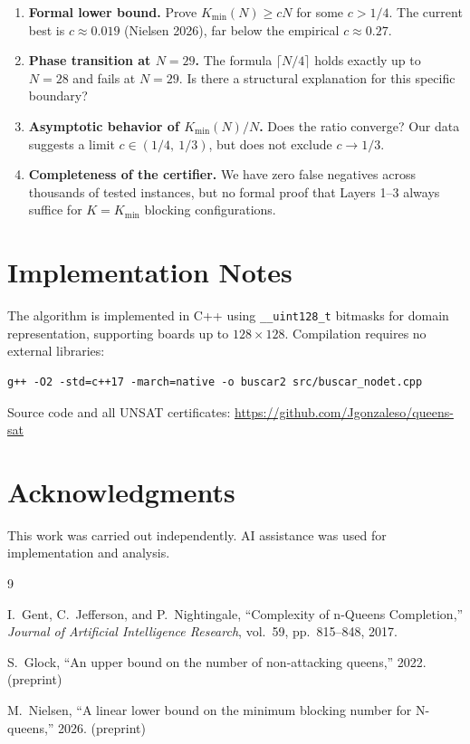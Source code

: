 \documentclass[11pt]{article}
\begin{document}
\begin{enumerate}

\item \textbf{Formal lower bound.}
Prove $K_{\min}(N) \geq cN$ for some $c > 1/4$.
The current best is $c \approx 0.019$ (Nielsen 2026), far below the empirical
$c \approx 0.27$.

\item \textbf{Phase transition at $N = 29$.}
The formula $\lceil N/4 \rceil$ holds exactly up to $N = 28$ and fails at
$N = 29$. Is there a structural explanation for this specific boundary?

\item \textbf{Asymptotic behavior of $K_{\min}(N)/N$.}
Does the ratio converge? Our data suggests a limit
$c \in (1/4,\ 1/3)$, but does not exclude $c \to 1/3$.

\item \textbf{Completeness of the certifier.}
We have zero false negatives across thousands of tested instances, but no
formal proof that Layers 1--3 always suffice for $K = K_{\min}$ blocking
configurations.

\end{enumerate}

\section{Implementation Notes}

The algorithm is implemented in C++ using \texttt{\_\_uint128\_t} bitmasks
for domain representation, supporting boards up to $128 \times 128$.
Compilation requires no external libraries:

\begin{verbatim}
g++ -O2 -std=c++17 -march=native -o buscar2 src/buscar_nodet.cpp
\end{verbatim}

Source code and all UNSAT certificates:
\url{https://github.com/Jgonzaleso/queens-sat}

\section*{Acknowledgments}

This work was carried out independently. AI assistance was used for
implementation and analysis.

\begin{thebibliography}{9}

I.~Gent, C.~Jefferson, and P.~Nightingale,
``Complexity of n-Queens Completion,''
\emph{Journal of Artificial Intelligence Research}, vol.~59, pp.~815--848, 2017.

S.~Glock,
``An upper bound on the number of non-attacking queens,''
2022. (preprint)

M.~Nielsen,
``A linear lower bound on the minimum blocking number for N-queens,''
2026. (preprint)

\end{thebibliography}
\end{document}
